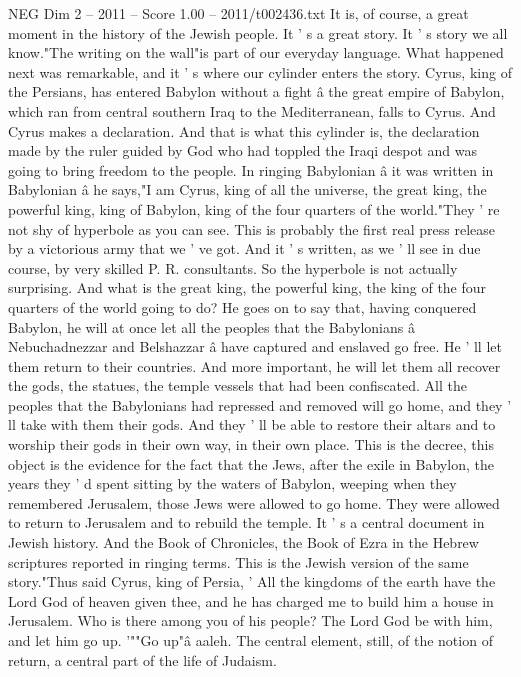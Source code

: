 \begin{textsample}{NEG Dim 2 – 2011 – Score 1.00 – 2011/t002436.txt}
It is, of course, a great moment in the history of the Jewish people.
It ' s a great story.
It ' s story we all know."The writing on the wall"is part of our everyday language.
What happened next was remarkable, and it ' s where our cylinder enters the story.
Cyrus, king of the Persians, has entered Babylon without a fight â the great empire of Babylon, which ran from central southern Iraq to the Mediterranean, falls to Cyrus.
And Cyrus makes a declaration.
And that is what this cylinder is, the declaration made by the ruler guided by God who had toppled the Iraqi despot and was going to bring freedom to the people.
In ringing Babylonian â it was written in Babylonian â he says,"I am Cyrus, king of all the universe, the great king, the powerful king, king of Babylon, king of the four quarters of the world."They ' re not shy of hyperbole as you can see.
This is probably the first real press release by a victorious army that we ' ve got.
And it ' s written, as we ' ll see in due course, by very skilled P.
R. consultants.
So the hyperbole is not actually surprising.
And what is the great king, the powerful king, the king of the four quarters of the world going to do?
He goes on to say that, having conquered Babylon, he will at once let all the peoples that the Babylonians â Nebuchadnezzar and Belshazzar â have captured and enslaved go free.
He ' ll let them return to their countries.
And more important, he will let them all recover the gods, the statues, the temple vessels that had been confiscated.
All the peoples that the Babylonians had repressed and removed will go home, and they ' ll take with them their gods.
And they ' ll be able to restore their altars and to worship their gods in their own way, in their own place.
This is the decree, this object is the evidence for the fact that the Jews, after the exile in Babylon, the years they ' d spent sitting by the waters of Babylon, weeping when they remembered Jerusalem, those Jews were allowed to go home.
They were allowed to return to Jerusalem and to rebuild the temple.
It ' s a central document in Jewish history.
And the Book of Chronicles, the Book of Ezra in the Hebrew scriptures reported in ringing terms.
This is the Jewish version of the same story."Thus said Cyrus, king of Persia, ' All the kingdoms of the earth have the Lord God of heaven given thee, and he has charged me to build him a house in Jerusalem.
Who is there among you of his people?
The Lord God be with him, and let him go up. '""Go up"â aaleh.
The central element, still, of the notion of return, a central part of the life of Judaism.

\end{textsample}
